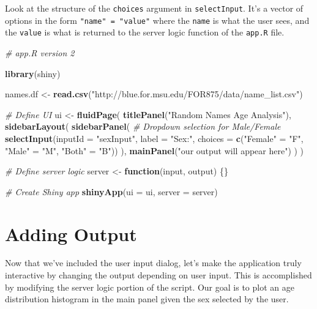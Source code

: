 \documentclass[]{krantz}
\makeatletter
\newenvironment{Shaded}{\begin{snugshade}}{\end{snugshade}}
\newcommand{\KeywordTok}[1]{\textcolor[rgb]{0.27,0.27,0.27}{\textbf{#1}}}
\newcommand{\DataTypeTok}[1]{\textcolor[rgb]{0.27,0.27,0.27}{#1}}
\newcommand{\StringTok}[1]{\textcolor[rgb]{0.5,0.5,0.5}{#1}}
\newcommand{\CommentTok}[1]{\textcolor[rgb]{0.37,0.37,0.37}{\textit{#1}}}
\newcommand{\ControlFlowTok}[1]{\textcolor[rgb]{0.27,0.27,0.27}{\textbf{#1}}}
\newcommand{\NormalTok}[1]{#1}
\newenvironment{kframe}{%
\medskip{}
\setlength{\fboxsep}{.8em}
 \def\at@end@of@kframe{}%
 \ifinner\ifhmode%
  \def\at@end@of@kframe{\end{minipage}}%
  \begin{minipage}{\columnwidth}%
 \fi\fi%
 \def\FrameCommand##1{\hskip\@totalleftmargin \hskip-\fboxsep
 \colorbox{shadecolor}{##1}\hskip-\fboxsep
     \hskip-\linewidth \hskip-\@totalleftmargin \hskip\columnwidth}%
 \MakeFramed {\advance\hsize-\width
   \@totalleftmargin\z@ \linewidth\hsize
   \@setminipage}}%
 {\par\unskip\endMakeFramed%
 \at@end@of@kframe}
\renewenvironment{Shaded}{\begin{kframe}}{\end{kframe}}
\makeatother
\begin{document}
Look at the structure of the \texttt{choices} argument in
\texttt{selectInput}. It's a vector of options in the form
\texttt{"name"\ =\ "value"} where the \texttt{name} is what the user
sees, and the \texttt{value} is what is returned to the server logic
function of the \texttt{app.R} file.

\begin{Shaded}
\begin{Highlighting}[]
\CommentTok{# app.R version 2}

\KeywordTok{library}\NormalTok{(shiny)}

\NormalTok{names.df <-}\StringTok{ }\KeywordTok{read.csv}\NormalTok{(}\StringTok{"http://blue.for.msu.edu/FOR875/data/name_list.csv"}\NormalTok{)}

\CommentTok{# Define UI}
\NormalTok{ui <-}\StringTok{ }\KeywordTok{fluidPage}\NormalTok{(}
  \KeywordTok{titlePanel}\NormalTok{(}\StringTok{"Random Names Age Analysis"}\NormalTok{),}
  \KeywordTok{sidebarLayout}\NormalTok{(}
    \KeywordTok{sidebarPanel}\NormalTok{(}
      \CommentTok{# Dropdown selection for Male/Female}
      \KeywordTok{selectInput}\NormalTok{(}\DataTypeTok{inputId =} \StringTok{"sexInput"}\NormalTok{, }\DataTypeTok{label =} \StringTok{"Sex:"}\NormalTok{,}
                  \DataTypeTok{choices =} \KeywordTok{c}\NormalTok{(}\StringTok{"Female"}\NormalTok{ =}\StringTok{ "F"}\NormalTok{, }
                              \StringTok{"Male"}\NormalTok{ =}\StringTok{ "M"}\NormalTok{, }
                              \StringTok{"Both"}\NormalTok{ =}\StringTok{ "B"}\NormalTok{))}
\NormalTok{    ),}
    \KeywordTok{mainPanel}\NormalTok{(}\StringTok{"our output will appear here"}\NormalTok{)}
\NormalTok{  )}
\NormalTok{)}

\CommentTok{# Define server logic}
\NormalTok{server <-}\StringTok{ }\ControlFlowTok{function}\NormalTok{(input, output) \{\}}

\CommentTok{# Create Shiny app}
\KeywordTok{shinyApp}\NormalTok{(}\DataTypeTok{ui =}\NormalTok{ ui, }\DataTypeTok{server =}\NormalTok{ server)}
\end{Highlighting}
\end{Shaded}

\section{Adding Output}\label{adding-output}

Now that we've included the user input dialog, let's make the
application truly interactive by changing the output depending on user
input. This is accomplished by modifying the server logic portion of the
script. Our goal is to plot an age distribution histogram in the main
panel given the sex selected by the user.
\end{document}
